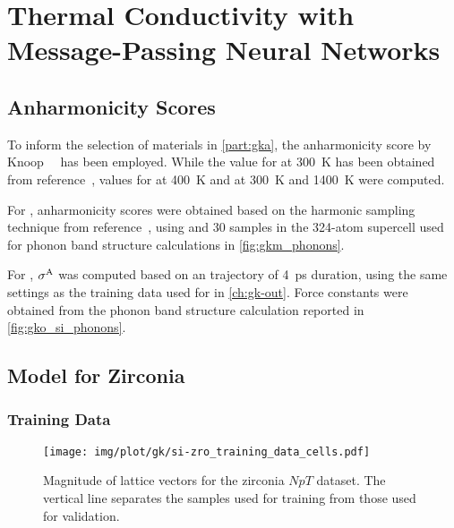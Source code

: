 
\chapter[Thermal Conductivity with\\ Message-Passing Neural Networks]{Thermal Conductivity with Message-Passing Neural Networks}
\label{ch:si-gka}

\section{Anharmonicity Scores}
\label{sec:si-gka_anha}

To inform the selection of materials in \cref{part:gka}, the anharmonicity score by Knoop~\etal~\cite{kpsc2020t} has been employed. While the value for  at \qty{300}{K} has been obtained from reference~\cite{k2021t}, values for  at \qty{400}{K} and at \qty{300}{K} and \qty{1400}{K} were computed.

For , anharmonicity scores were obtained based on the harmonic sampling technique from reference~\cite{kpsc2020t}, using \aims and \num{30} samples in the \num{324}-atom supercell used for phonon band structure calculations in \cref{fig:gkm_phonons}. 

For , $\sigma^{\text{A}}$ was computed based on an \aimd trajectory of \qty{4}{ps} duration, using the same settings as the training data used for  in \cref{ch:gk-out}. Force constants were obtained from the phonon band structure calculation reported in \cref{fig:gko_si_phonons}.

\clearpage
\section{Model for Zirconia}

\subsection{Training Data}
\begin{figure}
  \texttt{[image: img/plot/gk/si-zro\_training\_data\_cells.pdf]}
  \caption{
  Magnitude of lattice vectors for the zirconia $NpT$ dataset. The vertical line separates the samples used for training from those used for validation.
	}
	\label{fig:si-gkm_training_cells}
\end{figure}

\clearpage

